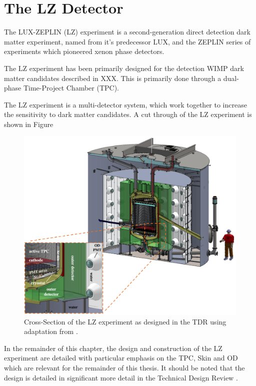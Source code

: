 \section{The LZ Detector}
\par
The LUX-ZEPLIN (LZ) experiment is a second-generation direct detection dark matter experiment, named from it's predecessor LUX, and the ZEPLIN series of experiments which pioneered xenon phase detectors.

The LZ experiment has been primarily designed for the detection WIMP dark matter candidates described in XXX. 
This is primarily done through a dual-phase Time-Project Chamber (TPC).

\par
The LZ experiment is a multi-detector system, which work together to increase the sensitivity to dark matter candidates.
A cut through of the LZ experiment is shown in Figure 

\begin{figure}
    \centering
    \includegraphics[width=\textwidth]{Figures/LZ/LZ_CAD_with_interactions.png}
    \caption{Cross-Section of the LZ experiment as designed in the TDR \cite{LZ_TechnicalDesignReview_ref} using adaptation from \cite{LZ_Ibles_LZStats_Thesis_ref}.}
    \label{fig:LZ_Cut_CAD}
\end{figure}



\par
In the remainder of this chapter, the design and construction of the LZ experiment are detailed with particular emphasis on the TPC, Skin and OD which are relevant for the remainder of this thesis. 
It should be noted that the design is detailed in significant more detail in the Technical Design Review \cite{LZ_TechnicalDesignReview_ref}.

